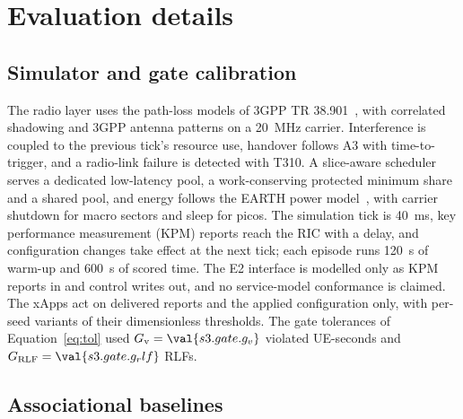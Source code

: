 \FloatBarrier
\section{Evaluation details}
\label{app:eval}

\subsection{Simulator and gate calibration}
\label{app:simparams}

The radio layer uses the path-loss models of 3GPP TR 38.901~\cite{3gpp38901}, with correlated shadowing and 3GPP
antenna patterns on a 20~MHz carrier. Interference is coupled to the previous tick's resource use, handover follows A3
with time-to-trigger, and a radio-link failure is detected with T310. A slice-aware scheduler serves a dedicated
low-latency pool, a work-conserving protected minimum share and a shared pool, and energy follows the EARTH power
model~\cite{auer2011earth}, with carrier shutdown for macro sectors and sleep for picos. The simulation tick is 40~ms,
key performance measurement (KPM) reports reach the RIC with a delay, and configuration changes take effect at the next
tick; each episode runs 120~s of warm-up and 600~s of scored time. The E2 interface is modelled only as KPM reports in
and control writes out, and no service-model conformance is claimed. The xApps act on delivered reports and the applied
configuration only, with per-seed variants of their dimensionless thresholds. The gate tolerances of
Equation~\eqref{eq:tol} used $G_{\mathrm{v}} = \val{s3.gate.g_v}$ violated UE-seconds and $G_{\mathrm{RLF}} = \val{s3.gate.g_rlf}$ RLFs.

\subsection{Associational baselines}
\label{app:baselines}

